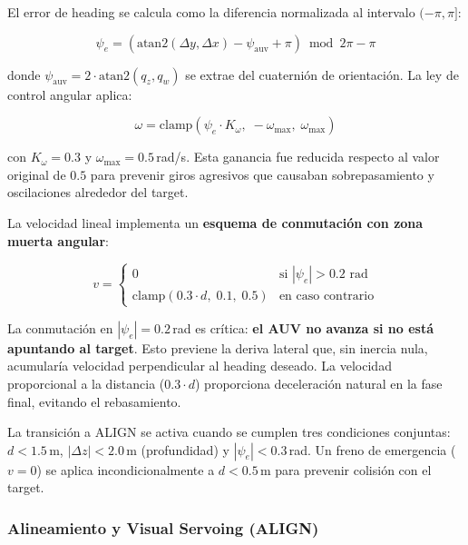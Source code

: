 \documentclass[10pt,twocolumn,letterpaper]{article}
\begin{document}
El error de heading se calcula como la diferencia normalizada al intervalo $(-\pi, \pi]$:

\begin{equation}
\psi_e = \left(\text{atan2}(\Delta y, \Delta x) - \psi_{\text{auv}} + \pi\right) \bmod 2\pi - \pi
\label{eq:heading_error}
\end{equation}

donde $\psi_{\text{auv}} = 2 \cdot \text{atan2}(q_z, q_w)$ se extrae del cuaternión de orientación. La ley de control angular aplica:

\begin{equation}
\omega = \text{clamp}\left(\psi_e \cdot K_\omega,\; -\omega_{\max},\; \omega_{\max}\right)
\label{eq:approach_angular}
\end{equation}

con $K_\omega = 0.3$ y $\omega_{\max} = 0.5$\,rad/s. Esta ganancia fue reducida respecto al valor original de $0.5$ para prevenir giros agresivos que causaban sobrepasamiento y oscilaciones alrededor del target.

La velocidad lineal implementa un \textbf{esquema de conmutación con zona muerta angular}:

\begin{equation}
v = \begin{cases}
0 & \text{si } |\psi_e| > 0.2 \text{ rad} \\
\text{clamp}\left(0.3 \cdot d,\; 0.1,\; 0.5\right) & \text{en caso contrario}
\end{cases}
\label{eq:approach_linear}
\end{equation}

La conmutación en $|\psi_e| = 0.2$\,rad es crítica: \textbf{el AUV no avanza si no está apuntando al target}. Esto previene la deriva lateral que, sin inercia nula, acumularía velocidad perpendicular al heading deseado. La velocidad proporcional a la distancia ($0.3 \cdot d$) proporciona deceleración natural en la fase final, evitando el rebasamiento.

La transición a ALIGN se activa cuando se cumplen tres condiciones conjuntas: $d < 1.5$\,m, $|\Delta z| < 2.0$\,m (profundidad) y $|\psi_e| < 0.3$\,rad. Un freno de emergencia ($v = 0$) se aplica incondicionalmente a $d < 0.5$\,m para prevenir colisión con el target.

\subsubsection{Alineamiento y Visual Servoing (ALIGN)}
\end{document}
